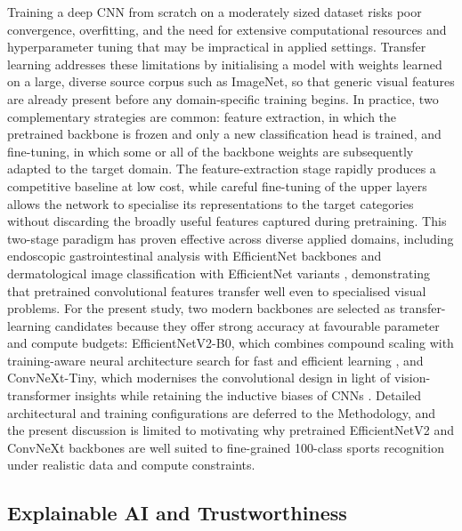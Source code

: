 Training a deep CNN from scratch on a moderately sized dataset risks poor convergence, overfitting, and the need for extensive computational resources and hyperparameter tuning that may be impractical in applied settings.
Transfer learning addresses these limitations by initialising a model with weights learned on a large, diverse source corpus such as ImageNet, so that generic visual features are already present before any domain-specific training begins.
In practice, two complementary strategies are common: feature extraction, in which the pretrained backbone is frozen and only a new classification head is trained, and fine-tuning, in which some or all of the backbone weights are subsequently adapted to the target domain.
The feature-extraction stage rapidly produces a competitive baseline at low cost, while careful fine-tuning of the upper layers allows the network to specialise its representations to the target categories without discarding the broadly useful features captured during pretraining.
This two-stage paradigm has proven effective across diverse applied domains, including endoscopic gastrointestinal analysis with EfficientNet backbones \citep{alotaibi2024gastro} and dermatological image classification with EfficientNet variants \citep{manole2024dermatology}, demonstrating that pretrained convolutional features transfer well even to specialised visual problems.
For the present study, two modern backbones are selected as transfer-learning candidates because they offer strong accuracy at favourable parameter and compute budgets: EfficientNetV2-B0, which combines compound scaling with training-aware neural architecture search for fast and efficient learning \citep{tan2021efficientnetv2}, and ConvNeXt-Tiny, which modernises the convolutional design in light of vision-transformer insights while retaining the inductive biases of CNNs \citep{liu2022convnext}.
Detailed architectural and training configurations are deferred to the Methodology, and the present discussion is limited to motivating why pretrained EfficientNetV2 and ConvNeXt backbones are well suited to fine-grained 100-class sports recognition under realistic data and compute constraints.

\subsection{Explainable AI and Trustworthiness}
\label{sec:intro-xai}

